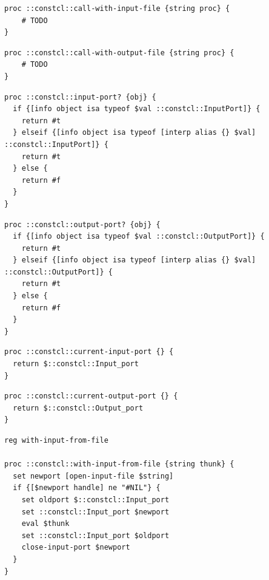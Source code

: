 \documentclass[twoside,9pt]{report}
\begin{document}
\noindent\makebox[\linewidth]{\rule{\linewidth}{0.4pt}}
\noindent\makebox[\linewidth]{\rule{\linewidth}{0.4pt}}
\begin{lstlisting}
proc ::constcl::call-with-input-file {string proc} {
    # TODO
}
\end{lstlisting}
\noindent\makebox[\linewidth]{\rule{\linewidth}{0.4pt}}
\noindent\makebox[\linewidth]{\rule{\linewidth}{0.4pt}}
\begin{lstlisting}
proc ::constcl::call-with-output-file {string proc} {
    # TODO
}
\end{lstlisting}
\noindent\makebox[\linewidth]{\rule{\linewidth}{0.4pt}}
\noindent\makebox[\linewidth]{\rule{\linewidth}{0.4pt}}
\begin{lstlisting}
proc ::constcl::input-port? {obj} {
  if {[info object isa typeof $val ::constcl::InputPort]} {
    return #t
  } elseif {[info object isa typeof [interp alias {} $val] ::constcl::InputPort]} {
    return #t
  } else {
    return #f
  }
}
\end{lstlisting}
\noindent\makebox[\linewidth]{\rule{\linewidth}{0.4pt}}
\noindent\makebox[\linewidth]{\rule{\linewidth}{0.4pt}}
\begin{lstlisting}
proc ::constcl::output-port? {obj} {
  if {[info object isa typeof $val ::constcl::OutputPort]} {
    return #t
  } elseif {[info object isa typeof [interp alias {} $val] ::constcl::OutputPort]} {
    return #t
  } else {
    return #f
  }
}
\end{lstlisting}
\noindent\makebox[\linewidth]{\rule{\linewidth}{0.4pt}}
\noindent\makebox[\linewidth]{\rule{\linewidth}{0.4pt}}
\begin{lstlisting}
proc ::constcl::current-input-port {} {
  return $::constcl::Input_port
}
\end{lstlisting}
\noindent\makebox[\linewidth]{\rule{\linewidth}{0.4pt}}
\noindent\makebox[\linewidth]{\rule{\linewidth}{0.4pt}}
\begin{lstlisting}
proc ::constcl::current-output-port {} {
  return $::constcl::Output_port
}
\end{lstlisting}
\noindent\makebox[\linewidth]{\rule{\linewidth}{0.4pt}}
\noindent\makebox[\linewidth]{\rule{\linewidth}{0.4pt}}
\begin{lstlisting}
reg with-input-from-file
 
proc ::constcl::with-input-from-file {string thunk} {
  set newport [open-input-file $string]
  if {[$newport handle] ne "#NIL"} {
    set oldport $::constcl::Input_port
    set ::constcl::Input_port $newport
    eval $thunk
    set ::constcl::Input_port $oldport
    close-input-port $newport
  }
}
\end{lstlisting}
\end{document}
